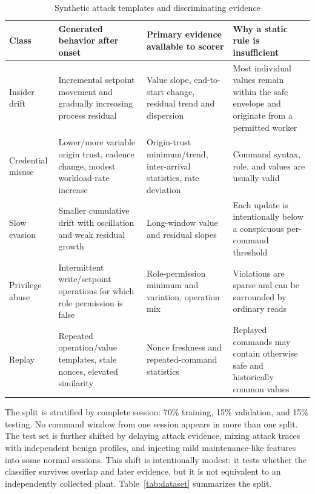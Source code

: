 \documentclass[journal]{IEEEtran}
\renewcommand{\arraystretch}{1.08}
\begin{document}
\begin{table}[t]
\centering
\caption{Synthetic attack templates and discriminating evidence}
\label{tab:attackgen}
\renewcommand{\arraystretch}{1.12}
\begin{tabularx}{\textwidth}{@{}lXXX@{}}
\toprule
\textbf{Class} & \textbf{Generated behavior after onset} & \textbf{Primary evidence available to scorer} & \textbf{Why a static rule is insufficient} \\
\midrule
Insider drift & Incremental setpoint movement and gradually increasing process residual & Value slope, end-to-start change, residual trend and dispersion & Most individual values remain within the safe envelope and originate from a permitted worker \\
Credential misuse & Lower/more variable origin trust, cadence change, modest workload-rate increase & Origin-trust minimum/trend, inter-arrival statistics, rate deviation & Command syntax, role, and values are usually valid \\
Slow evasion & Smaller cumulative drift with oscillation and weak residual growth & Long-window value and residual slopes & Each update is intentionally below a conspicuous per-command threshold \\
Privilege abuse & Intermittent write/setpoint operations for which role permission is false & Role-permission minimum and variation, operation mix & Violations are sparse and can be surrounded by ordinary reads \\
Replay & Repeated operation/value templates, stale nonces, elevated similarity & Nonce freshness and repeated-command statistics & Replayed commands may contain otherwise safe and historically common values \\
\bottomrule
\end{tabularx}
\end{table}

The split is stratified by complete session: 70\% training, 15\% validation, and 15\% testing. No command window from one session appears in more than one split. The test set is further shifted by delaying attack evidence, mixing attack traces with independent benign profiles, and injecting mild maintenance-like features into some normal sessions. This shift is intentionally modest: it tests whether the classifier survives overlap and later evidence, but it is not equivalent to an independently collected plant. Table~\ref{tab:dataset} summarizes the split.
\end{document}
